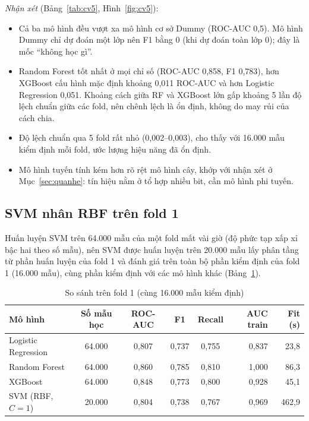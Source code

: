 \documentclass[12pt,a4paper,oneside]{report}
\begin{document}
\textit{Nhận xét} (Bảng~\ref{tab:cv5}, Hình~\ref{fig:cv5}):
\begin{itemize}
  \item Cả ba mô hình đều vượt xa mô hình cơ sở Dummy (ROC-AUC 0,5). Mô hình
        Dummy chỉ dự đoán một lớp nên F1 bằng 0 (khi dự đoán toàn lớp 0); đây
        là mốc ``không học gì''.
  \item Random Forest tốt nhất ở mọi chỉ số (ROC-AUC 0,858, F1 0,783),
        hơn XGBoost cấu hình mặc định khoảng 0,011 ROC-AUC và hơn Logistic
        Regression 0,051. Khoảng cách giữa RF và XGBoost lớn gấp khoảng 5 lần độ
        lệch chuẩn giữa các fold, nên chênh lệch là ổn định, không do may rủi
        của cách chia.
  \item Độ lệch chuẩn qua 5 fold rất nhỏ (0,002--0,003), cho thấy với 16.000 mẫu
        kiểm định mỗi fold, ước lượng hiệu năng đã ổn định.
  \item Mô hình tuyến tính kém hơn rõ rệt mô hình cây, khớp với nhận xét ở
        Mục~\ref{sec:quanhe}: tín hiệu nằm ở tổ hợp nhiều bit, cần mô
        hình phi tuyến.
\end{itemize}

\subsection{SVM nhân RBF trên fold 1}
Huấn luyện SVM trên 64.000 mẫu của một fold mất vài giờ (độ phức tạp xấp xỉ bậc
hai theo số mẫu), nên SVM được huấn luyện trên 20.000 mẫu lấy phân tầng từ phần
huấn luyện của fold 1 và đánh giá trên toàn bộ phần kiểm định của fold 1
(16.000 mẫu), cùng phần kiểm định với các mô hình khác (Bảng~\ref{tab:svm}).

\begin{table}[H]
  \centering
  \caption{So sánh trên fold 1 (cùng 16.000 mẫu kiểm định)}
  \label{tab:svm}
  \small
  \begin{tabular}{lccccrr}
    \toprule
    \textbf{Mô hình} & \textbf{Số mẫu học} & \textbf{ROC-AUC} & \textbf{F1} & \textbf{Recall} & \textbf{AUC train} & \textbf{Fit (s)} \\
    \midrule
    Logistic Regression & 64.000 & 0,807 & 0,737 & 0,755 & 0,837 & 23,8 \\
    Random Forest & 64.000 & 0,860 & 0,785 & 0,810 & 1,000 & 86,3 \\
    XGBoost & 64.000 & 0,848 & 0,773 & 0,800 & 0,928 & 45,1 \\
    SVM (RBF, $C=1$) & 20.000 & 0,804 & 0,738 & 0,767 & 0,969 & 462,9 \\
    \bottomrule
  \end{tabular}
\end{table}
\end{document}
